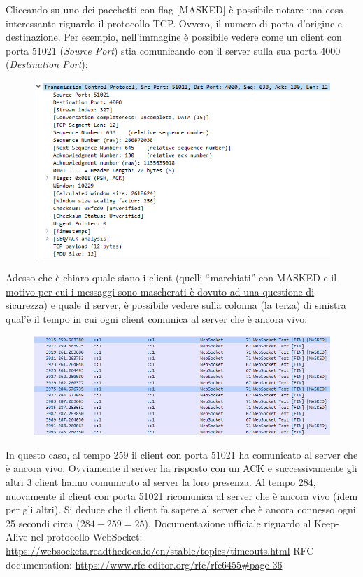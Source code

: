 \documentclass[a4paper]{article}
\newcommand{\dquotes}[1]{``#1''}
\begin{document}
	\noindent
	Cliccando su uno dei pacchetti con flag [MASKED] è possibile notare una cosa interessante riguardo il protocollo TCP. Ovvero, il numero di porta d'origine e destinazione. Per esempio, nell'immagine è possibile vedere come un client con porta 51021 (\emph{Source Port}) stia comunicando con il server sulla sua porta 4000 (\emph{Destination Port}):
	\begin{figure}[!htp]
		\centering
		\includegraphics[width=\textwidth]{img/soluzioni_websocket-chat/wireshark-3.png}
	\end{figure}\newpage
	
	\noindent
	Adesso che è chiaro quale siano i client (quelli \dquotes{marchiati} con MASKED e il \href{https://en.wikipedia.org/wiki/WebSocket#Client_to_Server_Masking}{motivo per cui i messaggi sono mascherati è dovuto ad una questione di sicurezza}) e quale il server, è possibile vedere sulla colonna (la terza) di sinistra qual'è il tempo in cui ogni client comunica al server che è ancora vivo:
	\begin{figure}[!htp]
		\centering
		\includegraphics[width=\textwidth]{img/soluzioni_websocket-chat/wireshark-4.png}
	\end{figure}
	
	\noindent
	In questo caso, al tempo 259 il client con porta 51021 ha comunicato al server che è ancora vivo. Ovviamente il server ha risposto con un ACK e successivamente gli altri 3 client hanno comunicato al server la loro presenza. Al tempo 284, nuovamente il client con porta 51021 ricomunica al server che è ancora vivo (idem per gli altri). Si deduce che il client fa sapere al server che è ancora connesso ogni 25 secondi circa ($284-259=25$).\newline
	Documentazione ufficiale riguardo al Keep-Alive nel protocollo WebSocket: \url{https://websockets.readthedocs.io/en/stable/topics/timeouts.html}\newline
	RFC documentation: \url{https://www.rfc-editor.org/rfc/rfc6455#page-36}\newpage
	
\end{document}
